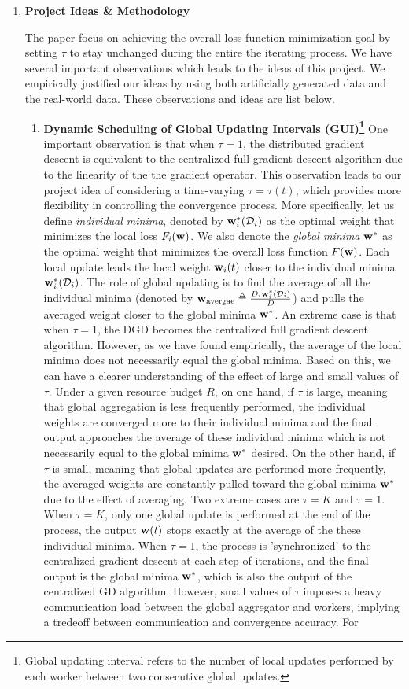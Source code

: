 \documentclass[11pt, fullpage,letterpaper]{article}
\newcommand{\tbf}{\textbf}
\newcommand{\bw}{{\bf w}}
\begin{document}
\begin{enumerate}
\item \tbf{Project Ideas \& Methodology}

The paper \cite{ref4} focus on achieving the overall loss function minimization goal by setting $\tau$ to stay unchanged during the entire the iterating process. We have several important observations which leads to the ideas of this project. We empirically justified our ideas by using both artificially generated data and the real-world data. These observations and ideas are list below.
\begin{enumerate}
\item \tbf{Dynamic Scheduling of Global Updating Intervals (GUI)\footnote{Global updating interval refers to the number of local updates performed by each worker between two consecutive global updates.}} One important observation is that when $\tau =1$, the distributed gradient descent is equivalent to the centralized full gradient descent algorithm due to the linearity of the the gradient operator. This observation leads to our project idea of considering a time-varying $\tau=\tau (t)$, which provides more flexibility in controlling the convergence process. More specifically, let us define \emph{individual minima}, denoted by $\bw_i^*(\mathcal{D}_i)$ as the optimal weight that minimizes the local loss $F_i(\bw)$. We also denote the \emph{global minima} $\bw^*$ as the optimal weight that minimizes the overall loss function $F(\bw)$. Each local update leads the local weight $\bw_i(t)$ closer to the individual minima $\bw_i^*(\mathcal{D}_i)$. The role of global updating is to find the average of all the individual minima (denoted by $\bw_{\rm avergae}\triangleq \frac{D_i\bw_i^*(\mathcal{D}_i)}{D}$) and pulls the averaged weight closer to the global minima $\bw^*$. An extreme case is that when $\tau =1$, the DGD becomes the centralized full gradient descent algorithm. However, as we have found empirically, the average of the local minima does not necessarily equal the global minima. Based on this, we can have a clearer understanding of the effect of large and small values of $\tau$. Under a given resource budget $R$, on one hand, if $\tau$ is large, meaning that global aggregation is less frequently performed, the individual weights are converged more to their individual minima and the final output approaches the average of these individual minima which is not necessarily equal to the global minima $\bw^*$ desired. On the other hand, if $\tau$ is small, meaning that global updates are performed more frequently, the averaged weights are constantly pulled toward the global minima $\bw^*$ due to the effect of averaging. Two extreme cases are $\tau=K$ and $\tau=1$. When $\tau = K$, only one global update is performed at the end of the process, the output $\bw(t)$ stops exactly at the average of the these individual minima. When $\tau = 1$, the process is 'synchronized' to the centralized gradient descent at each step of iterations, and the final output is the global minima $\bw^*$, which is also the output of the centralized GD algorithm. However, small values of $\tau$ imposes a heavy communication load between the global aggregator and workers, implying a tredeoff between communication and convergence accuracy. For 
\end{enumerate}
\end{enumerate}
\end{document}
